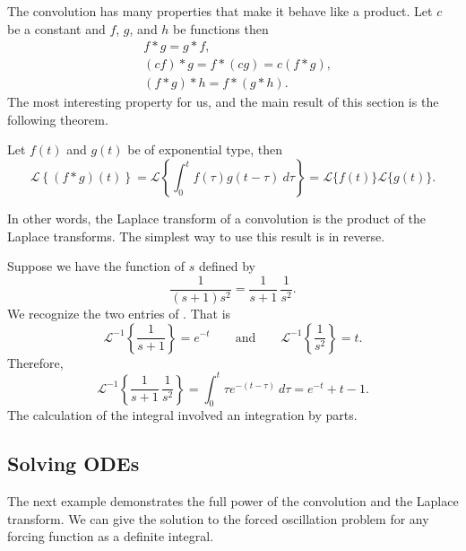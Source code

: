 The convolution has many properties that make it behave like a product.
Let $c$ be a constant and $f$, $g$, and $h$ be functions then
\begin{align*}
& f * g = g * f , \\
& (c f) * g = f * (c g) = c (f*g) , \\
& ( f * g ) * h = f * ( g * h ) .
\end{align*}
The most interesting property for us, and
the main result of this section is the following theorem.

\begin{theorem}
Let $f(t)$ and $g(t)$ be of exponential type, then
\begin{equation*}
\boxed{~~
\mathcal{L} \left\{ (f*g)(t) \right\}
=
\mathcal{L} \left\{ \int_0^t f(\tau) g(t-\tau) ~ d\tau \right\}
=
\mathcal{L} \{ f(t) \} \mathcal{L} \{ g(t) \} .
~~}
\end{equation*}
\end{theorem}

In other words, the Laplace transform of a convolution is the product
of the Laplace transforms.  The simplest way to use this result is in
reverse.

\begin{example}
Suppose we have the function of $s$
defined by
\begin{equation*}
\frac{1}{(s+1)s^2} = 
\frac{1}{s+1}\,
\frac{1}{s^2} .
\end{equation*}
We recognize the two entries of .  That is
\begin{equation*}
\mathcal{L}^{-1} 
\left\{
\frac{1}{s+1} \right\}
= e^{-t}
\qquad \text{and} \qquad
\mathcal{L}^{-1} 
\left\{
\frac{1}{s^2} \right\} 
= t.
\end{equation*}
Therefore,
\begin{equation*}
\mathcal{L}^{-1}
\left\{
\frac{1}{s+1}\,
\frac{1}{s^2} \right\}
=
\int_0^t
\tau e^{-(t-\tau)} ~d\tau
=
e^{-t}+t-1 .
\end{equation*}
The calculation of the integral involved an integration by parts.
\end{example}

\subsection{Solving ODEs}

The next example demonstrates the full power of the convolution and
the Laplace transform.  We can give the solution to
the forced oscillation problem for any forcing function as a definite
integral.

